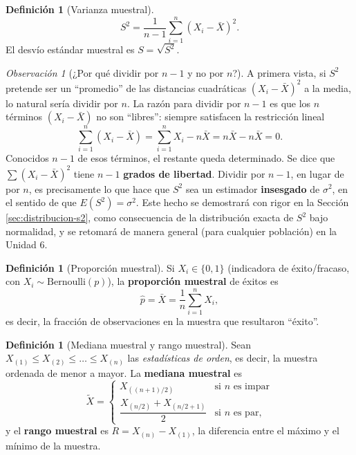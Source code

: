 \documentclass[11pt,a4paper]{article}
\theoremstyle{plain}
\theoremstyle{definition}
\newtheorem{definicion}[teorema]{Definición}
\theoremstyle{remark}
\newtheorem{observacion}[teorema]{Observación}
\begin{document}
\begin{definicion}[Varianza muestral]
$$S^2 = \frac{1}{n-1}\sum_{i=1}^{n} (X_i - \bar X)^2.$$
El desvío estándar muestral es $S=\sqrt{S^2}$.
\end{definicion}

\begin{observacion}[¿Por qué dividir por $n-1$ y no por $n$?]
A primera vista, si $S^2$ pretende ser un ``promedio'' de las distancias cuadráticas $(X_i-\bar X)^2$ a la media, lo natural sería dividir por $n$. La razón para dividir por $n-1$ es que los $n$ términos $(X_i-\bar X)$ no son ``libres'': siempre satisfacen la restricción lineal
$$\sum_{i=1}^n (X_i-\bar X) = \sum_{i=1}^n X_i - n\bar X = n\bar X - n \bar X = 0.$$
Conocidos $n-1$ de esos términos, el restante queda determinado. Se dice que $\sum (X_i-\bar X)^2$ tiene $n-1$ \textbf{grados de libertad}. Dividir por $n-1$, en lugar de por $n$, es precisamente lo que hace que $S^2$ sea un estimador \textbf{insesgado} de $\sigma^2$, en el sentido de que $E(S^2)=\sigma^2$. Este hecho se demostrará con rigor en la Sección \ref{sec:distribucion-s2}, como consecuencia de la distribución exacta de $S^2$ bajo normalidad, y se retomará de manera general (para cualquier población) en la Unidad 6.
\end{observacion}

\begin{definicion}[Proporción muestral]
Si $X_i \in \{0,1\}$ (indicadora de éxito/fracaso, con $X_i\sim\text{Bernoulli}(p)$), la \textbf{proporción muestral} de éxitos es
$$\hat p = \bar X = \frac{1}{n}\sum_{i=1}^n X_i,$$
es decir, la fracción de observaciones en la muestra que resultaron ``éxito''.
\end{definicion}

\begin{definicion}[Mediana muestral y rango muestral]
Sean $X_{(1)}\leq X_{(2)}\leq \dots \leq X_{(n)}$ las \emph{estadísticas de orden}, es decir, la muestra ordenada de menor a mayor. La \textbf{mediana muestral} es
$$\tilde X = \begin{cases} X_{((n+1)/2)} & \text{si } n \text{ es impar} \\[4pt] \dfrac{X_{(n/2)}+X_{(n/2+1)}}{2} & \text{si } n \text{ es par}, \end{cases}$$
y el \textbf{rango muestral} es $R = X_{(n)} - X_{(1)}$, la diferencia entre el máximo y el mínimo de la muestra.
\end{definicion}
\end{document}
